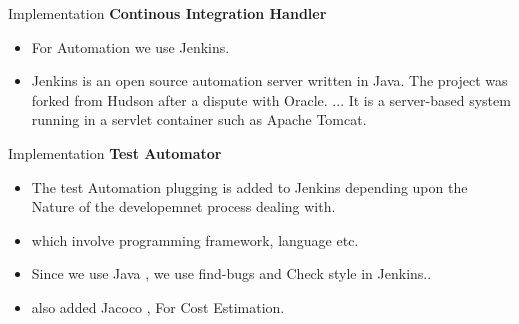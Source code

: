 \documentclass{beamer}
\begin{document}
\begin{frame}{Implementation}
	\textbf{Continous Integration Handler}
	\begin{itemize}
		
		\item For Automation we use Jenkins.
		\vspace{0.05cm}
		
		\item Jenkins is an open source automation server written in Java. The project was forked from Hudson after a dispute with Oracle. ... It is a server-based system running in a servlet container such as Apache Tomcat.
		
		
	\end{itemize}	
\end{frame}


\begin{frame}{Implementation}
	\textbf{Test Automator}
	\begin{itemize}
		
		\item The test Automation plugging is added to Jenkins depending upon the Nature of the developemnet process dealing with.
		\vspace{0.05cm}
		
		\item which involve programming framework, language etc.
		\vspace{0.05cm}
		\item Since we use Java , we use find-bugs and Check style in Jenkins..
		\vspace{0.05cm}
		\item also added Jacoco , For Cost Estimation.
		
		
	\end{itemize}	
\end{frame}
\end{document}
